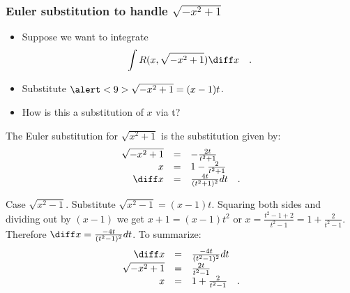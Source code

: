\begin{frame}
\frametitle{Euler substitution to handle $\sqrt{-x^2+1} $}
\begin{itemize}
\item<1-> Suppose we want to integrate 
\[
\int R(x, \sqrt{-x^2+1})\diff x\quad .
\]

\item<2-> Substitute $\alert<9>{\sqrt{-x^2+1}=(x-1)t }$. 
\item<3-> How is this a substitution of $x$ via t?
\end{itemize}
\begin{definition}
The Euler substitution for $\sqrt{x^2+1}$ is the substitution given by:
\[
\begin{array}{rcl}
\sqrt{-x^2+1}&=&-\frac{2t}{t^2+1}\\
x&=&1-\frac{2}{t^2+1}\\
\diff x&=&\frac{4t}{(t^2+1)^2}dt\quad .
\end{array}
\] 
\end{definition}
\end{frame}
\begin{frame}
Case $\sqrt{x^2-1} $. Substitute $\sqrt{x^2-1}=(x-1)t$. Squaring both sides and dividing out by $(x-1)$ we get $x+1=(x-1)t^2$ or $x=\frac{t^2-1+2}{t^2-1}= 1+\frac{2}{t^2-1}$. Therefore $\diff x=\frac{-4t}{(t^2-1)^2}dt$. To summarize:
\[
\begin{array}{rcl}
\diff x&=&\frac{-4t}{(t^2-1)^2}dt\\
\sqrt{-x^2+1}&=&\frac{2t}{t^2-1} \\
x&=&1+\frac{2}{t^2-1}\quad .
\end{array}
\] 
\end{frame}
